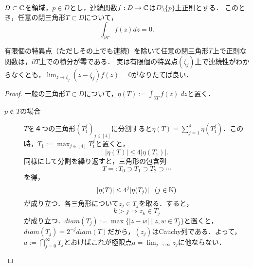 \documentclass[uplatex, dvipdfmx]{jsreport}
\begin{document}
\begin{lemma}[閉三角形領域に対するCauchyの定理]
    $D\subset\mathbb{C}$を領域，$p\in D$とし，連続関数$f:D\to\mathbb{C}$は$D\setminus\{p\}$上正則とする．
    このとき，任意の閉三角形$T\subset D$について，
    \[\int_{\partial T}f(z)dz=0.\]
\end{lemma}
\begin{remarks}
    有限個の特異点（ただしその上でも連続）を除いて任意の閉三角形$T$上で正則な関数は，$\partial T$上での積分が零である．
    実は有限個の特異点$(\zeta_j)$上で連続性がわからなくとも，$\lim_{z\to\zeta_j}(z-\zeta_j)f(z)=0$がなりたてば良い．
\end{remarks}
\begin{proof}
    一般の三角形$T\subset D$について，$\eta(T):=\int_{\partial T}f(z)\;dz$と置く．
    \begin{description}
        \item[$p\notin T$の場合] $T$を４つの三角形$(T_1^j)_{j\in[4]}$に分割すると$\eta(T)=\sum^4_{j=1}\eta(T_1^j)$．この時，$T_1:=\max_{j\in[4]}T_1^j$と置くと，
        \[|\eta(T)|\le 4|\eta(T_1)|.\]
        同様にして分割を繰り返すと，三角形の包含列
        \[ T=:T_0\supset T_1\supset T_2\supset\cdots \]
        を得，
        \[ |\eta(T)|\le 4^{j}|\eta(T_j)|\;\;\;(j\in\mathbb{N}) \]
        が成り立つ．各三角形について$z_j\in T_j$を取る．すると，
        \[ k>j\Rightarrow z_k\in T_j \]
        が成り立つ．$diam(T_j):=\max\{|z-w|\mid z,w\in T_j\}$と置くと，$diam(T_j)=2^{-j}diam(T)$だから，$(z_j)$はCauchy列である．よって，$a:=\bigcap_{j=0}^\infty T_j$とおけばこれが極限点$a=\lim_{j\to\infty}z_j$に他ならない．


\end{description}
\end{proof}
\end{document}
